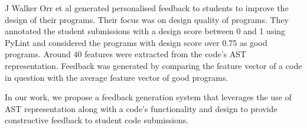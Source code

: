 J Walker Orr et al \cite{T} generated personalised feedback
to students to improve the design of their programs. Their
focus was on design quality of programs. They annotated the
student submissions with a design score between 0 and 1 using
PyLint and considered the programs with design score over
0.75 as good programs. Around 40 features were extracted from
the code's AST representation. Feedback was generated by
comparing the feature vector of a code in question with the
average feature vector of good programs.

In our work, we propose a feedback generation system that
leverages the use of AST representation along with a code's
functionality and design to provide constructive feedback to
student code submissions.


 





